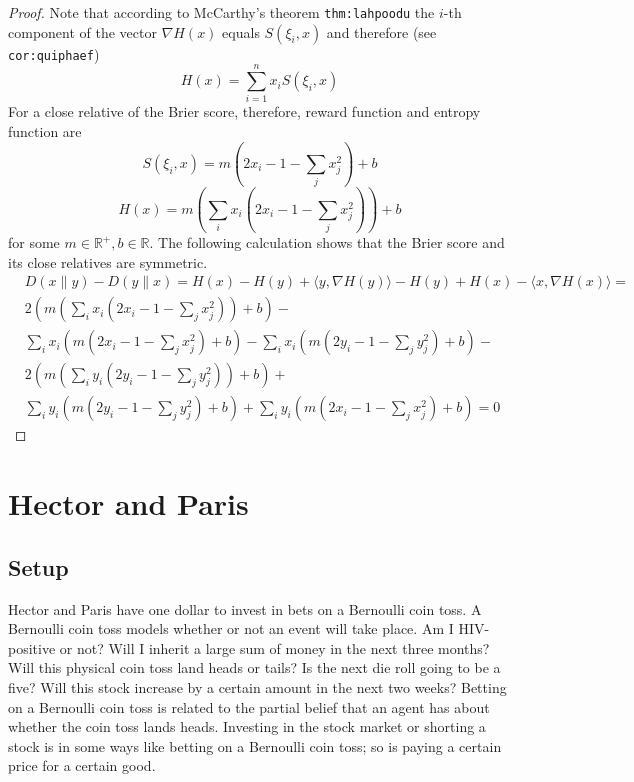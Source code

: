 \documentclass[12pt]{article}
\begin{document}
\begin{proof}
Note that according to McCarthy's theorem
\texttt{thm:lahpoodu} the $i$-th component of the vector
$\nabla{}H(x)$ equals $S(\xi_{i},x)$ and therefore (see \texttt{cor:quiphaef})
\begin{equation}
  \label{eq:idiirioj}
  H(x)=\sum_{i=1}^{n}x_{i}S(\xi_{i},x)
\end{equation}
For a close relative of the Brier score, therefore, reward function
and entropy function are
\begin{equation}
  \label{eq:paegeina}
    S(\xi_{i},x)=m\left(2x_{i}-1-\sum_{j}x_{j}^{2}\right)+b
\end{equation}
\begin{equation}
  \label{eq:thughica}
    H(x)=m\left(\sum_{i}{}x_{i}\left(2x_{i}-1-\sum_{j}x_{j}^{2}\right)\right)+b
\end{equation}
for some $m\in\mathbb{R}^{+},b\in\mathbb{R}$. The following
calculation shows that the Brier score and its close relatives are
symmetric.
\begin{equation}
  \label{eq:uudeilah}
  \begin{split}
    & D(x\|y)-D(y\|x)=H(x)-H(y)+\langle{}y,\nabla{}H(y)\rangle-H(y)+H(x)-\langle{}x,\nabla{}H(x)\rangle= \\
    & 2\left(m\left(\sum_{i}{}x_{i}\left(2x_{i}-1-\sum_{j}x_{j}^{2}\right)\right)+b\right)- \\
    & \sum_{i}x_{i}\left(m\left(2x_{i}-1-\sum_{j}x_{j}^{2}\right)+b\right)-\sum_{i}x_{i}\left(m\left(2y_{i}-1-\sum_{j}y_{j}^{2}\right)+b\right)- \\
    & 2\left(m\left(\sum_{i}{}y_{i}\left(2y_{i}-1-\sum_{j}y_{j}^{2}\right)\right)+b\right)+ \\
    & \sum_{i}y_{i}\left(m\left(2y_{i}-1-\sum_{j}y_{j}^{2}\right)+b\right)+\sum_{i}y_{i}\left(m\left(2x_{i}-1-\sum_{j}x_{j}^{2}\right)+b\right)=0
  \end{split}
\end{equation}
\end{proof}

\section{Hector and Paris}
\label{section:shauboda}

\subsection{Setup}
\label{subsection:iewohgae}

Hector and Paris have one dollar to invest in bets on a Bernoulli coin
toss. A Bernoulli coin toss models whether or not an event will take
place. Am I HIV-positive or not? Will I inherit a large sum of money
in the next three months? Will this physical coin toss land heads or
tails? Is the next die roll going to be a five? Will this stock
increase by a certain amount in the next two weeks? Betting on a
Bernoulli coin toss is related to the partial belief that an agent has
about whether the coin toss lands heads. Investing in the stock market
or shorting a stock is in some ways like betting on a Bernoulli coin
toss; so is paying a certain price for a certain good. 
\end{document}
